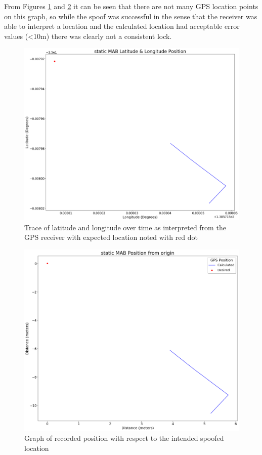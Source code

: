 From Figures \ref{fig:MABStaticCoord} and \ref{fig:MABStaticPosition} it can be seen that there are not many GPS location points on this graph, so while the spoof was
successful in the sense that the receiver was able to interpret a location and the calculated location had acceptable error values (<10m) there was clearly not a consistent lock. 

\begin{figure}[H]
    \begin{centering}
        \includegraphics[width=12cm,keepaspectratio]{Figures/2021_3_30_static_MAB Lat long position.png}
        \caption{Trace of latitude and longitude over time as interpreted from the GPS receiver with expected location noted with red dot}
        \label{fig:MABStaticCoord}
    \end{centering}
\end{figure}

\begin{figure}[H]
    \begin{centering}
        \includegraphics[width=12cm,keepaspectratio]{Figures/2021_3_30_static_MAB Position from origin.png}
        \caption{Graph of recorded position with respect to the intended spoofed location}
        \label{fig:MABStaticPosition}
    \end{centering}
\end{figure}

